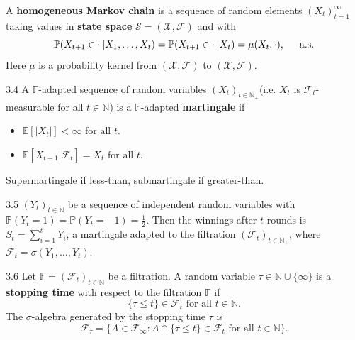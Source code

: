 \documentclass[10pt]{article}
\theoremstyle{definition}
\newenvironment{example*}[1]{%
  \IfBlankTF{#1}
    {\renewcommand{\themanualexampleinner}{\unskip}}
    {\renewcommand\themanualexampleinner{#1}}%
  \manualexampleinner
}{\endmanualexampleinner}
\newenvironment{definition*}[1]{%
  \IfBlankTF{#1}
    {\renewcommand{\themanualdefinitioninner}{\unskip}}
    {\renewcommand\themanualdefinitioninner{#1}}%
  \manualdefinitioninner
}{\endmanualdefinitioninner}
\begin{document}
\begin{definition*}{}
    A \textbf{homogeneous Markov chain} is a sequence of random elements $(X_t)_{t=1}^\infty$ taking values in \textbf{state space} $\mathcal{S} = (\mathcal{X},\mathcal{F})$ and with
    \begin{equation*}
        \mathbb{P}(X_{t+1} \in \cdot \hspace{0.2em} | X_1, \ldots, X_t) = \mathbb{P}(X_{t+1} \in \cdot \hspace{0.2em} | X_t) = \mu(X_t, \cdot), \hspace{1.5em} \text{a.s.}
    \end{equation*}
    Here $\mu$ is a probability kernel from $(\mathcal{X}, \mathcal{F})$ to $(\mathcal{X}, \mathcal{F})$.
\end{definition*}

\begin{definition*}{3.4}
    A $\mathbb{F}$-adapted sequence of random variables $(X_t)_{t \in \mathbb{N}_+}$(i.e. $X_t$ is $\mathcal{F}_t$-measurable for all $t \in \mathbb{N}$) is a $\mathbb{F}$-adapted \textbf{martingale} if
    \begin{itemize}
        \item[(a)] $\mathbb{E}[|X_t|] < \infty \text{ for all } t.$
        \item[(b)] $\mathbb{E}[X_{t+1} | \mathcal{F}_t] = X_t \text{ for all } t.$
    \end{itemize}
    Supermartingale if less-than, submartingale if greater-than.
\end{definition*}

\begin{example*}{3.5}
    $(Y_t)_{t \in \mathbb{N}}$ be a sequence of independent random variables with $\mathbb{P}(Y_t = 1) = \mathbb{P}(Y_t = -1) = \frac{1}{2}$.
    Then the winnings after $t$ rounds is $S_t = \sum_{i=1}^{t} Y_i$, a martingale adapted to the filtration $(\mathcal{F}_t)_{t \in \mathbb{N}_+}$, where $\mathcal{F}_t = \sigma(Y_1, \ldots, Y_t)$.
\end{example*}

\begin{definition*}{3.6}
    Let $\mathbb{F} = (\mathcal{F}_t)_{t \in \mathbb{N}}$ be a filtration.
    A random variable $\tau \in \mathbb{N} \cup \{\infty\}$ is a \textbf{stopping time} with respect to the filtration $\mathbb{F}$ if
    \begin{equation*}
        \{\tau \leq t\} \in \mathcal{F}_t \text{ for all } t \in \mathbb{N}.
    \end{equation*}
    The $\sigma$-algebra generated by the stopping time $\tau$ is
    \begin{equation*}
        \mathcal{F}_\tau = \{A \in \mathcal{F}_\infty : A \cap \{\tau \leq t\} \in \mathcal{F}_t \text{ for all } t \in \mathbb{N} \}.
    \end{equation*}
\end{definition*}
\end{document}
